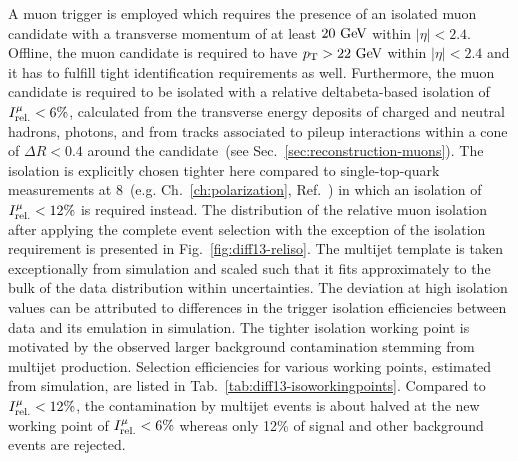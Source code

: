 A muon trigger is employed which requires the presence of an isolated muon candidate with a transverse momentum of at least $20~\textrm{GeV}$ within $|\eta|<2.4$. Offline, the muon candidate is required to have $p_\textrm{T}>22~\textrm{GeV}$ within $|\eta|<2.4$ and it has to fulfill tight identification requirements as well. Furthermore, the muon candidate is required to be isolated with a relative \gls{deltabeta}-based isolation of $\muiso<6\%$, calculated from the transverse energy deposits of charged and neutral hadrons, photons, and from tracks associated to pileup interactions within a cone of $\Delta R<0.4$ around the candidate~(see Sec.~\ref{sec:reconstruction-muons}). The isolation is explicitly chosen tighter here compared to single-top-quark measurements at 8~\TeV (e.g. Ch.~\ref{ch:polarization}, Ref.~\cite{Khachatryan:2014iya}) in which an isolation of $\muiso<12\%$ is required instead. The distribution of the relative muon isolation after applying the complete event selection with the exception of the isolation requirement is presented in Fig.~\ref{fig:diff13-reliso}. The multijet template is taken exceptionally from simulation and scaled such that it fits approximately to the bulk of the data distribution within uncertainties. The deviation at high isolation values can be attributed to differences in the trigger isolation efficiencies between data and its emulation in simulation. The tighter isolation working point is motivated by the observed larger background contamination stemming from multijet production. Selection efficiencies for various working points, estimated from simulation, are listed in Tab.~\ref{tab:diff13-isoworkingpoints}. Compared to $\muiso<12\%$, the contamination by multijet events is about halved at the new working point of $\muiso<6\%$ whereas only 12\% of signal and other background events are rejected.


